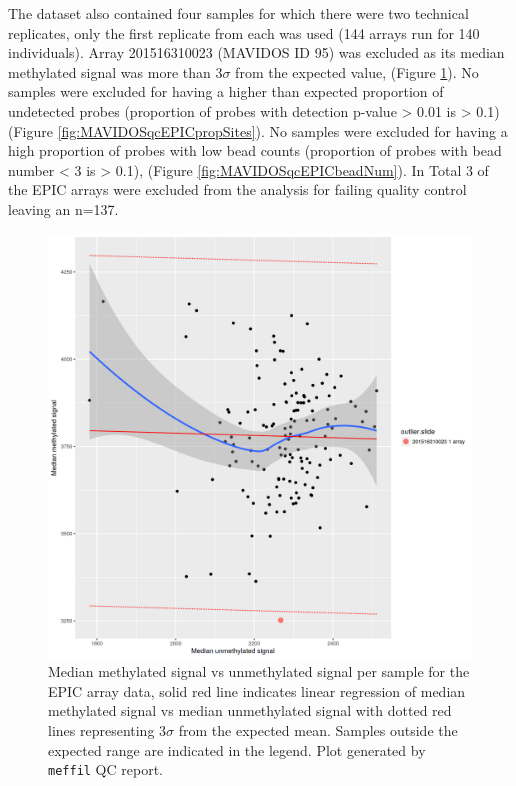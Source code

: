 \documentclass[
]{book}
\begin{document}
The dataset also contained four samples for which there were two technical replicates, only the first replicate from each was used (144 arrays run for 140 individuals).
Array 201516310023 (MAVIDOS ID 95) was excluded as its median methylated signal was more than \(3\sigma\) from the expected value, (Figure \ref{fig:MAVIDOSqcEPICmethVsUnmeth}).
No samples were excluded for having a higher than expected proportion of undetected probes (proportion of probes with detection p-value \textgreater{} 0.01 is \textgreater{} 0.1) (Figure \ref{fig:MAVIDOSqcEPICpropSites}).
No samples were excluded for having a high proportion of probes with low bead counts (proportion of probes with bead number \textless{} 3 is \textgreater{} 0.1), (Figure \ref{fig:MAVIDOSqcEPICbeadNum}).
In Total 3 of the EPIC arrays were excluded from the analysis for failing quality control leaving an n=137.

\begin{figure}

{\centering \includegraphics[width=0.8\linewidth]{figs/MAVIDOSqcEPICmethVsUnmeth} 

}

\caption{Median methylated signal vs unmethylated signal per sample for the EPIC array data, solid red line indicates linear regression of median methylated signal vs median unmethylated signal with dotted red lines representing \(3\sigma\) from the expected mean. Samples outside the expected range are indicated in the legend. Plot generated by \texttt{meffil} QC report.}\label{fig:MAVIDOSqcEPICmethVsUnmeth}
\end{figure}
\end{document}
